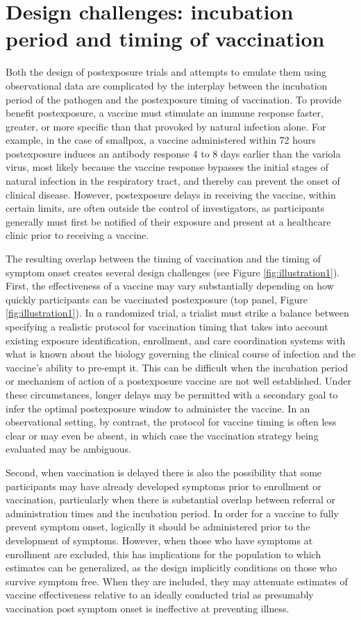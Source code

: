 \documentclass[11pt]{article}
\begin{document}
\section{Design challenges: incubation period and timing of vaccination}
Both the design of postexposure trials and attempts to emulate them using observational data are complicated by the interplay between the incubation period of the pathogen and the postexposure timing of vaccination. To provide benefit postexposure, a vaccine must stimulate an immune response faster, greater, or more specific than that provoked by natural infection alone. For example, in the case of smallpox, a vaccine administered within 72 hours postexposure induces an antibody response 4 to 8 days earlier than the variola virus, most likely because the vaccine response bypasses the initial stages of natural infection in the respiratory tract, and thereby can prevent the onset of clinical disease. However, postexposure delays in receiving the vaccine, within certain limits, are often outside the control of investigators, as participants generally must first be notified of their exposure and present at a healthcare clinic prior to receiving a vaccine. 

The resulting overlap between the timing of vaccination and the timing of symptom onset creates several design challenges (see Figure \ref{fig:illustration1}). First, the effectiveness of a vaccine may vary substantially depending on how quickly participants can be vaccinated postexposure (top panel, Figure \ref{fig:illustration1}). In a randomized trial, a trialist must strike a balance between specifying a realistic protocol for vaccination timing that takes into account existing exposure identification, enrollment, and care coordination systems with what is known about the biology governing the clinical course of infection and the vaccine's ability to pre-empt it. This can be difficult when the incubation period or mechanism of action of a postexposure vaccine are not well established. Under these circumstances, longer delays may be permitted with a secondary goal to infer the optimal postexposure window to administer the vaccine. In an observational setting, by contrast, the protocol for vaccine timing is often less clear or may even be absent, in which case the vaccination strategy being evaluated may be ambiguous.

Second, when vaccination is delayed there is also the possibility that some participants may have already developed symptoms prior to enrollment or vaccination, particularly when there is substantial overlap between referral or administration times and the incubation period. In order for a vaccine to fully prevent symptom onset, logically it should be administered prior to the development of symptoms. However, when those who have symptoms at enrollment are excluded, this has implications for the population to which estimates can be generalized, as the design implicitly conditions on those who survive symptom free. When they are included, they may attenuate estimates of vaccine effectiveness relative to an ideally conducted trial as presumably vaccination post symptom onset is ineffective at preventing illness. 
\end{document}
